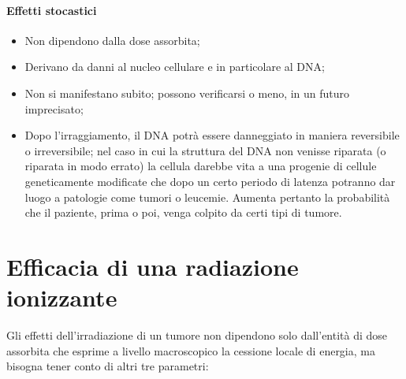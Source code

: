 \documentclass[a4paper,11pt,twoside,openany]{book}
\theoremstyle{definition}
\theoremstyle{plain}
\theoremstyle{plain}
\theoremstyle{definition}
\begin{document}
\paragraph{Effetti stocastici} %
\begin{itemize}
\item Non dipendono dalla dose assorbita;
\item Derivano da danni al nucleo cellulare e in particolare al DNA;
\item Non si manifestano subito; possono verificarsi o meno, in un futuro imprecisato;
\item Dopo l'irraggiamento, il DNA potrà essere danneggiato in maniera reversibile o irreversibile; nel caso in cui la struttura del DNA non venisse riparata (o riparata in modo errato) la cellula darebbe vita a una progenie di cellule geneticamente modificate che dopo un certo periodo di latenza potranno dar luogo a patologie come tumori o leucemie. Aumenta pertanto la probabilità che il paziente, prima o poi, venga colpito da certi tipi di tumore.
\end{itemize}

\section{Efficacia di una radiazione ionizzante} %
Gli effetti dell'irradiazione di un tumore non dipendono solo dall'entità di dose assorbita che esprime a livello macroscopico la cessione locale di energia, ma bisogna tener conto di altri tre parametri:
\end{document}
